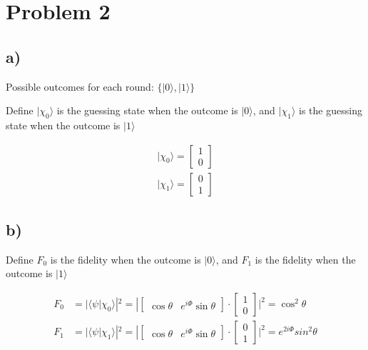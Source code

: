 \section*{Problem 2}
\subsection*{a)}
Possible outcomes for each round: $\{|0\rangle, |1\rangle\} $ \\

\begin{note}{Define} $|\chi_0\rangle$ is the guessing state when the outcome is $|0\rangle$, and $|\chi_1\rangle$ is the guessing state when the outcome is $|1\rangle$
\end{note}
\begin{align*}
    |\chi_0\rangle = \begin{bmatrix}
        1 \\ 
        0
    \end{bmatrix} \\
    |\chi_1\rangle = \begin{bmatrix}
        0 \\
        1
    \end{bmatrix}
\end{align*}

\subsection*{b)}
\begin{note}{Define}
$F_0$ is the fidelity when the outcome is $|0\rangle$, and $F_1$ is the fidelity when the outcome is $|1\rangle$
\end{note}

\begin{align*}
    F_0 &= |\langle\psi|\chi_0\rangle|^2
    = |\begin{bmatrix}
        \cos\theta & e^{i\Phi}\sin\theta
    \end{bmatrix}\cdot
    \begin{bmatrix}
        1 \\ 0
    \end{bmatrix}
    |^2 = \cos^2\theta \\
    F_1 &= |\langle\psi|\chi_1\rangle|^2
    = |\begin{bmatrix}
        \cos\theta & e^{i\Phi}\sin\theta
    \end{bmatrix}\cdot
    \begin{bmatrix}
        0 \\ 1
    \end{bmatrix}
    |^2 = e^{2i\Phi}sin^2\theta
\end{align*}

